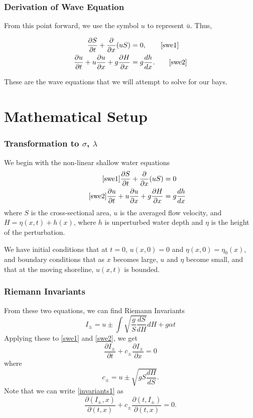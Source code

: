 \documentclass[xcolor=dvipsnames]{beamer}
\begin{document}
\begin{frame}
\frametitle{Derivation of Wave Equation}
From this point forward, we use the symbol $u$ to represent $\bar{u}$.  Thus,
\begin{framed}
\begin{align}
\frac{\partial S}{\partial t} + \frac{\partial}{\partial x}(uS) &= 0, \tag*{\eqref{swe1}}\\
\frac{\partial u}{\partial t} + u \frac{\partial u}{\partial x} + g \frac{\partial H}{\partial x} &= g \frac{dh}{dx}. \tag*{\eqref{swe2}}
\end{align}
\end{framed}
These are the wave equations that we will attempt to solve for our bays.
\end{frame}


\section{Mathematical Setup}

\begin{frame}
\frametitle{Transformation to $\sigma$, $\lambda$}
We begin with the non-linear shallow water equations
\begin{align} 
\tag*{\eqref{swe1}}
\frac{\partial S}{\partial t} + \frac{\partial}{\partial x} (uS) &= 0  \\
\tag*{\eqref{swe2}}
\frac{\partial u}{\partial t} + u \frac{\partial u}{\partial x} + g \frac{\partial H}{\partial x} &= g \frac{dh}{dx}
\end{align}
where $S$ is the cross-sectional area, $u$ is the averaged flow velocity, and $H = \eta(x,t) + h(x)$, where $h$ is unperturbed water depth and $\eta$ is the height of the perturbation.

We have initial conditions that at $t=0$, $u(x,0) = 0$ and $\eta(x,0) = \eta_0(x)$, and boundary conditions that as $x$ becomes large, $u$ and $\eta$ become small, and that at the moving shoreline, $u(x,t)$ is bounded.

\end{frame}


\begin{frame}
\frametitle{Riemann Invariants}
From these two equations, we can find Riemann Invariants
\[
I_\pm = u \pm \int \sqrt{\frac{g}{S}\frac{dS}{dH}} dH + g \alpha t
\]
Applying these to \eqref{swe1} and \eqref{swe2}, we get
\begin{equation}\label{invariants1}
\frac{\partial I_\pm}{\partial t} + c_{\pm} \frac{\partial I_\pm}{\partial x} = 0
\end{equation}
where
\[
c_\pm = u \pm \sqrt{g S \frac{dH}{dS}}.
\]
Note that we can write \eqref{invariants1} as
\[
\frac{\partial (I_\pm, x)}{\partial (t,x)} + c_\pm \frac{\partial(t, I_\pm)}{\partial (t,x)} = 0.
\]
\end{frame}
\end{document}
